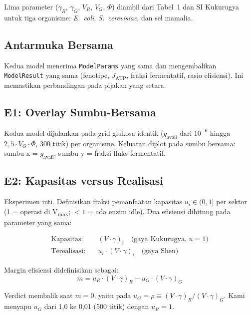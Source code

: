 Lima parameter ($\gamma_R$, $\gamma_G$, $V_R$, $V_G$, $\Phi$) diambil
dari Tabel~1 dan SI Kukurugya \cite{kukurugya2024} untuk tiga organisme:
\textit{E.\ coli}, \textit{S.\ cerevisiae}, dan sel mamalia.

\subsection{Antarmuka Bersama}

Kedua model menerima \texttt{ModelParams} yang sama dan mengembalikan
\texttt{ModelResult} yang sama (fenotipe, $J_\text{ATP}$, fraksi
fermentatif, rasio efisiensi). Ini memastikan perbandingan pada
pijakan yang setara.

\subsection{E1: Overlay Sumbu-Bersama}

Kedua model dijalankan pada grid glukosa identik ($g_\text{avail}$ dari
$10^{-6}$ hingga $2{,}5 \cdot V_G \cdot \Phi$, 300 titik) per organisme.
Keluaran diplot pada sumbu bersama: sumbu-x = $g_\text{avail}$, sumbu-y =
fraksi fluks fermentatif.

\subsection{E2: Kapasitas versus Realisasi}

Eksperimen inti. Definisikan fraksi pemanfaatan kapasitas $u_i \in (0, 1]$
per sektor (1 = operasi di V\textsubscript{max}; $<1$ = ada enzim idle).
Dua efisiensi dihitung pada parameter yang sama:

\begin{align}
    \text{Kapasitas:} &\quad (V \cdot \gamma)_i \quad \text{(gaya Kukurugya, } u=1\text{)} \label{eq:cap_eff} \\
    \text{Terealisasi:} &\quad u_i \cdot (V \cdot \gamma)_i \quad \text{(gaya Shen)} \label{eq:real_eff}
\end{align}

Margin efisiensi didefinisikan sebagai:
\begin{equation}
    m = u_R \cdot (V \cdot \gamma)_R - u_G \cdot (V \cdot \gamma)_G
    \label{eq:margin}
\end{equation}

Verdict membalik saat $m = 0$, yaitu pada $u_G = \rho \equiv (V\!\cdot\!\gamma)_R / (V\!\cdot\!\gamma)_G$.
Kami menyapu $u_G$ dari 1{,}0 ke 0{,}01 (500 titik) dengan $u_R = 1$.

